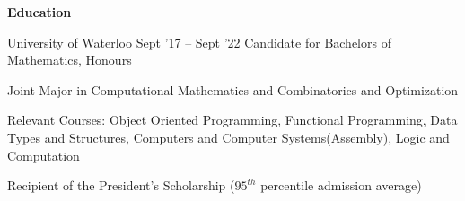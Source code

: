 \documentclass{resume} %
\begin{document}

\begin{rSection}{\textbf{Education}}
  \begin{rSubsection}{University of Waterloo}
		     {Sept '17 -- Sept '22}
		     {Candidate for Bachelors of Mathematics, Honours}
		     {}
	\item Joint Major in Computational Mathematics and Combinatorics and Optimization
	\item Relevant Courses: Object Oriented Programming, Functional Programming, Data Types and Structures, Computers and Computer Systems(Assembly), Logic and Computation
    \item  Recipient of the President's Scholarship
      ($95^{th}$ percentile admission average)
  \end{rSubsection}
\end{rSection} 
\end{document}
